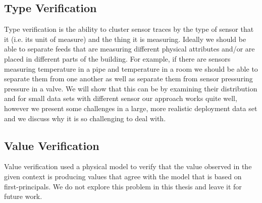 \subsection{Type Verification}
Type verification is the ability to cluster sensor traces by the type of sensor that it (i.e. its unit of measure) and the thing it is measuring.
Ideally we should be able to separate feeds that are measuring different physical attributes and/or are placed in different parts of the building.
For example, if there are sensors measuring temperature in a pipe and temperature in a room we should be able to separate them from one another as well
as separate them from sensor pressuring pressure in a valve.  We will show that this can be by examining their distribution and for 
small data sets with different sensor our approach works quite well, however we present some challenges in a large, more realistic deployment
data set and we discuss why it is so challenging to deal with.


\subsection{Value Verification}
Value verification used a physical model to verify that the value observed in the given context is producing values that agree with the model
that is based on first-principals.  We do not explore this problem in this thesis and leave it for future work.


